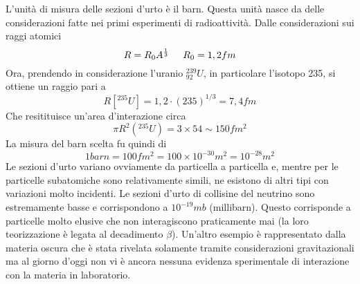 L'unità di misura delle sezioni d'urto è il barn. 
Questa unità nasce da delle considerazioni fatte nei primi esperimenti di radioattività.
Dalle considerazioni sui raggi atomici 
\begin{equation}
R=R_0A^{\frac{1}{3}}\hspace{0.5cm} R_0=1,2fm
\end{equation}
Ora, prendendo in considerazione l'uranio $^{239}_{92}U$, in particolare l'isotopo 235, si ottiene un raggio pari a 
\begin{equation}
R[^{235}U]=1,2\cdot (235)^{1/3}=7,4fm
\end{equation}
Che resitituisce un'area d'interazione circa
\begin{equation}
\pi R^2(^{235}U)=3\times54\sim 150fm^2
\end{equation}
La misura del barn scelta fu quindi di
\begin{equation}
1barn=100fm^2=100\times 10^{-30}m^2=10^{-28}m^2
\end{equation}
Le sezioni d'urto variano ovviamente da particella a particella e, mentre per le particelle subatomiche sono relativamente simili, ne esistono di altri tipi con variazioni molto incidenti.
Le sezioni d'urto di collisine del neutrino sono estremamente basse e corrispondono a $10^{-19}mb$ (millibarn).
Questo corrisponde a particelle molto elusive che non interagiscono praticamente mai (la loro teorizzazione è legata al decadimento $\beta$).
Un'altro esempio è rappresentato dalla materia oscura che è stata rivelata solamente tramite considerazioni gravitazionali ma al giorno d'oggi non vi è ancora nessuna evidenza sperimentale di interazione con la materia in laboratorio.
